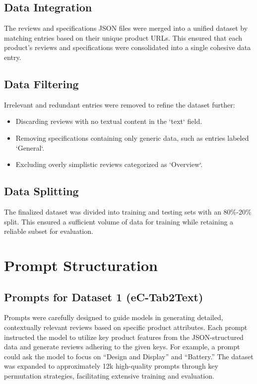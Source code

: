 \subsection{Data Integration}
The reviews and specifications JSON files were merged into a unified dataset by matching entries based on their unique product URLs. This ensured that each product's reviews and specifications were consolidated into a single cohesive data entry.

\subsection{Data Filtering}
Irrelevant and redundant entries were removed to refine the dataset further:
\begin{itemize}
    \item Discarding reviews with no textual content in the `text` field.
    \item Removing specifications containing only generic data, such as entries labeled `General`.
    \item Excluding overly simplistic reviews categorized as `Overview`.
\end{itemize}

\subsection{Data Splitting}
The finalized dataset was divided into training and testing sets with an 80\%-20\% split. This ensured a sufficient volume of data for training while retaining a reliable subset for evaluation.

\section{Prompt Structuration}
\subsection{Prompts for Dataset 1 (eC-Tab2Text)}
Prompts were carefully designed to guide models in generating detailed, contextually relevant reviews based on specific product attributes. Each prompt instructed the model to utilize key product features from the JSON-structured data and generate reviews adhering to the given keys. For example, a prompt could ask the model to focus on ``Design and Display'' and ``Battery.'' The dataset was expanded to approximately 12k high-quality prompts through key permutation strategies, facilitating extensive training and evaluation.

